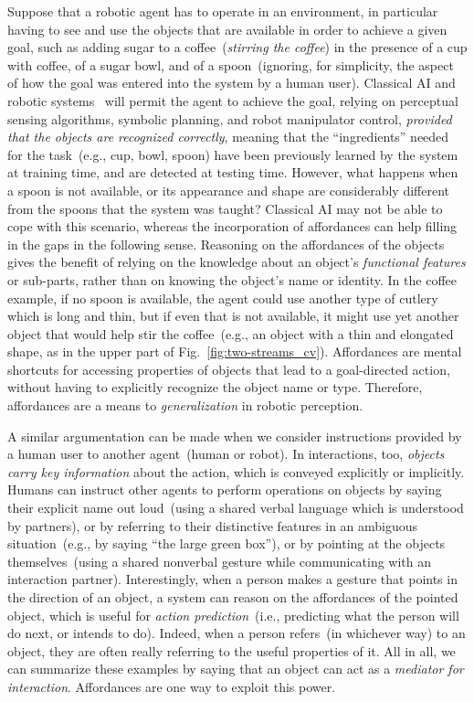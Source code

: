 Suppose that a robotic agent has to operate in an environment, in particular having to see and use the objects that are available in order to achieve a given goal, such as adding sugar to a coffee~(\emph{stirring the coffee}) in the presence of a cup with coffee, of a sugar bowl, and of a spoon~(ignoring, for simplicity, the aspect of how the goal was entered into the system by a human user).
Classical \ac{AI} and robotic systems~\cite{russell_norvig:ai3,siciliano:2016:handbook2} will permit the agent to achieve the goal, relying on perceptual sensing algorithms, symbolic planning, and robot manipulator control, \emph{provided that the objects are recognized correctly}, meaning that the ``ingredients'' needed for the task~(e.g., cup, bowl, spoon) have been previously learned by the system at training time, and are detected at testing time.
However, what happens when a spoon is not available, or its appearance and shape are considerably different from the spoons that the system was taught?
Classical \ac{AI} may not be able to cope with this scenario, whereas the incorporation of affordances can help filling in the gaps in the following sense.
Reasoning on the affordances of the objects gives the benefit of relying on the knowledge about an object's \emph{functional features} or sub-parts, rather than on knowing the object's name or identity.
In the coffee example, if no spoon is available, the agent could use another type of cutlery which is long and thin, but if even that is not available, it might use yet another object that would help stir the coffee~(e.g., an object with a thin and elongated shape, as in the upper part of Fig.~\ref{fig:two-streams_cv}).
Affordances are mental shortcuts for accessing properties of objects that lead to a goal-directed action, without having to explicitly recognize the object name or type.
Therefore, affordances are a means to \emph{generalization} in robotic perception.
\label{coffee_example}

A similar argumentation can be made when we consider instructions provided by a human user to another agent~(human or robot).
In interactions, too, \emph{objects carry key information} about the action, which is conveyed explicitly or implicitly.
Humans can instruct other agents to perform operations on objects by saying their explicit name out loud~(using a shared verbal language which is understood by partners), or by referring to their distinctive features in an ambiguous situation~(e.g., by saying ``the large green box''), or by pointing at the objects themselves~(using a shared nonverbal gesture while communicating with an interaction partner).
Interestingly, when a person makes a gesture that points in the direction of an object, a system can reason on the affordances of the pointed object, which is useful for \emph{action prediction}~(i.e., predicting what the person will do next, or intends to do).
Indeed, when a person refers~(in whichever way) to an object, they are often really referring to the useful properties of it.
All in all, we can summarize these examples by saying that an object can act as a \emph{mediator for interaction}.
\nopagebreak[1]
Affordances are one way to exploit this power.
\label{action_prediction}

